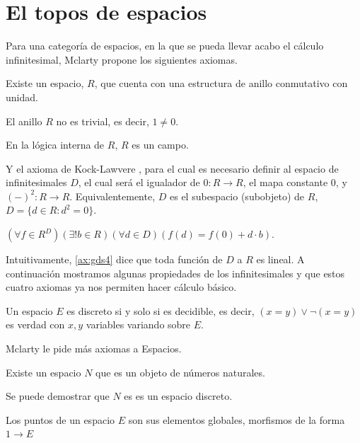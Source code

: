 \chapter{El topos de espacios}
\label{espacios}

Para una categoría de espacios, en la que se pueda llevar acabo el cálculo infinitesimal, 
Mclarty propone los siguientes axiomas.

\begin{axioma}[label=ax:gds1]
Existe un espacio, $R$, que cuenta con una estructura de anillo conmutativo con unidad.
\end{axioma}
\begin{axioma}[label=ax:gds2]
El anillo $R$ no es trivial, es decir, $1\not = 0$.
\end{axioma}
\begin{axioma}[label=ax:gds3]
En la lógica interna de $R$, $R$ es un campo.
\end{axioma}
Y el axioma de Kock-Lawvere \cite{lawvere1979categorical}, para el cual es necesario definir
al espacio de infinitesimales $D$, el cual será el igualador de $0\colon R\to R$, el mapa constante $0$, y $(-)^2\colon R\to R$.
Equivalentemente, $D$ es el subespacio (subobjeto) de $R$, $D= \{d \in R\colon d^2=0 \}$.
\begin{axioma}[label=ax:gds4]
$(\forall f \in R^D)(\exists ! b \in R)(\forall d \in D) (f(d) = f(0)+d \cdot b)$.
\end{axioma}
Intuitivamente, \ref{ax:gds4} dice que toda función de $D$ a $R$ es lineal. A continuación 
mostramos algunas propiedades de los infinitesimales y que estos cuatro axiomas ya nos 
permiten hacer cálculo básico.

\begin{definition}[label=def:discreto]
  Un espacio $E$ es discreto si y solo si es decidible, es decir, $(x=y) \lor \lnot(x = y)$ es verdad con $x,y$ variables
  variando sobre $E$.
\end{definition}

Mclarty le pide más axiomas a Espacios.

\begin{axioma}[label=ax:gds5]
Existe un espacio $N$ que es un objeto de números naturales.
\end{axioma}

Se puede demostrar que $N$ es es un espacio discreto.

\begin{definition}[label=puntos]
Los puntos de un espacio $E$ son sus elementos globales, morfismos de la forma $1\to E$
\end{definition}

